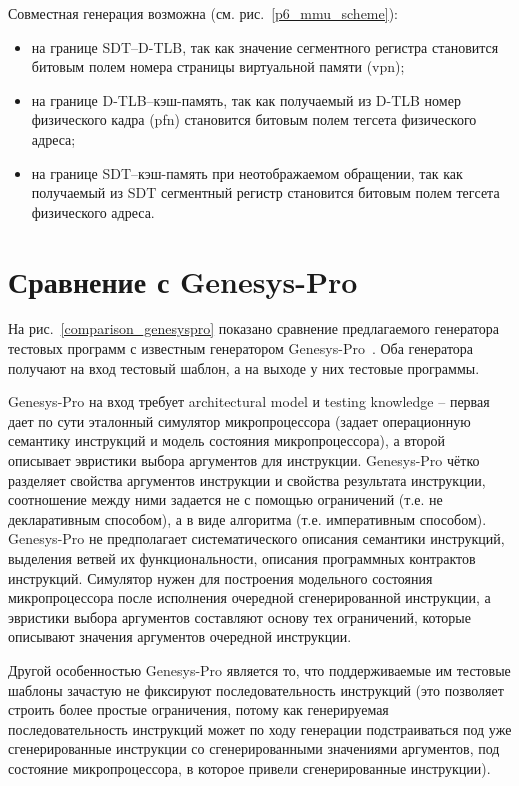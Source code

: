 \documentclass[14pt]{extreport}
\begin{document}
Совместная генерация возможна (см. рис.~\ref{p6_mmu_scheme}):
\begin{itemize}
  \item на границе SDT--D-TLB, так как значение сегментного регистра
  становится битовым полем номера страницы виртуальной памяти (vpn);
  \item на границе D-TLB--кэш-память, так как получаемый из D-TLB номер
физического кадра (pfn) становится битовым полем тегсета физического
адреса;
  \item на границе SDT--кэш-память при неотображаемом обращении, так как
  получаемый из SDT сегментный регистр становится битовым полем тегсета физического
адреса.
\end{itemize}


\section{Сравнение с Genesys-Pro}
На рис.~\ref{comparison_genesyspro} показано сравнение предлагаемого
генератора тестовых программ с известным генератором
Genesys-Pro~\cite{GenesysPro}. Оба генератора получают на вход
тестовый шаблон, а на выходе у них тестовые программы.

Genesys-Pro на вход требует architectural model и testing knowledge
-- первая дает по сути эталонный симулятор микропроцессора (задает
операционную семантику инструкций и модель состояния
микропроцессора), а второй описывает эвристики выбора аргументов для
инструкции. Genesys-Pro чётко разделяет свойства аргументов
инструкции и свойства результата инструкции, соотношение между ними
задается не с помощью ограничений (т.е. не декларативным способом),
а в виде алгоритма (т.е. императивным способом). Genesys-Pro не
предполагает систематического описания семантики инструкций,
выделения ветвей их функциональности, описания программных
контрактов инструкций. Симулятор нужен для построения модельного
состояния микропроцессора после исполнения очередной сгенерированной
инструкции, а эвристики выбора аргументов составляют основу тех
ограничений, которые описывают значения аргументов очередной
инструкции.

Другой особенностью Genesys-Pro является то, что поддерживаемые им
тестовые шаблоны зачастую не фиксируют последовательность инструкций
(это позволяет строить более простые ограничения, потому как
генерируемая последовательность инструкций может по ходу генерации
подстраиваться под уже сгенерированные инструкции со
сгенерированными значениями аргументов, под состояние
микропроцессора, в которое привели сгенерированные инструкции).
\end{document}
